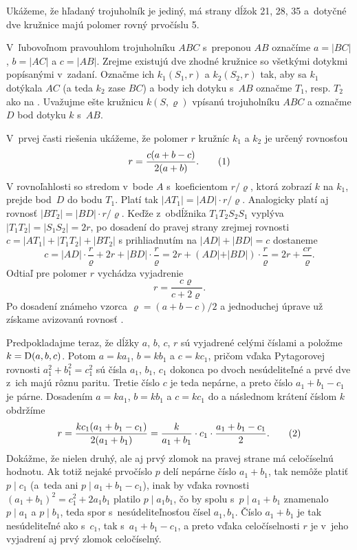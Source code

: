 {%
Ukážeme, že hľadaný trojuholník je jediný, má strany dĺžok 21, 28, 35
a~dotyčné dve kružnice majú polomer rovný prvočíslu 5.
\let\ro=\varrho

V~ľubovoľnom pravouhlom trojuholníku $ABC$ s~preponou $AB$ označíme
$a=|BC|$, $b=|AC|$ a $c=|AB|$. Zrejme existujú dve zhodné kružnice
so všetkými dotykmi popísanými v~zadaní. Označme ich $k_1(S_1,r)$ a
$k_2(S_2,r)$ tak, aby sa $k_1$ dotýkala $AC$ (a teda $k_2$ zase
$BC$) a body ich dotyku s~$AB$ označme $T_1$, resp. $T_2$
ako
na \obr{}. Uvažujme ešte kružnicu $k(S,\varrho)$ vpísanú
trojuholníku $ABC$ a označme $D$ bod dotyku $k$ s~$AB$.
%

V~prvej časti riešenia ukážeme, že polomer $r$ kružníc $k_1$ a $k_2$
je určený rovnosťou
$$
r=\frac{c(a+b-c)}{2(a+b)}.
\tag1
$$
V rovnoľahlosti so stredom v~bode $A$ s~koeficientom $r/\ro$,
ktorá zobrazí $k$ na $k_1$, prejde bod~$D$ do bodu $T_1$.
Platí tak $|AT_1|=|AD|\cdot r/\ro$. Analogicky platí
aj rovnosť $|BT_2|=|BD|\cdot r/\ro$.
Keďže z~obdĺžnika $T_1T_2S_2S_1$ vyplýva $|T_1T_2|=|S_1S_2|=2r$,
po dosadení do pravej strany zrejmej rovnosti
$c=|AT_1|+|T_1T_2|+|BT_2|$ s prihliadnutím na $|AD|+|BD|=c$
dostaneme
$$
c=|AD|\cdot\frac{r}{\ro}+2r+ |BD|\cdot\frac{r}{\ro}=
2r+(AD| + |BD|)\cdot\frac{r}{\ro}=
2r+\frac{cr}{\ro}.
$$
Odtiaľ pre polomer $r$ vychádza vyjadrenie
$$
r =\frac{c\ro}{c+2\ro}.
$$
Po dosadení známeho vzorca $\ro=(a+b-c)/2$ a jednoduchej úprave
už získame avizovanú rovnosť .

\smallskip
Predpokladajme teraz, že dĺžky $a$, $b$, $c$, $r$ sú vyjadrené
celými číslami a položme $k=\D(a,b,c)$. Potom $a=ka_1$, $b=kb_1$ a
$c=kc_1$, pričom vďaka Pytagorovej rovnosti $a_1^2+b_1^2=c_1^2$
sú čísla $a_1$, $b_1$, $c_1$ dokonca po dvoch nesúdeliteľné a
prvé dve z~ich majú rôznu paritu. Tretie číslo $c$ je teda nepárne,
a preto číslo $a_1+b_1-c_1$ je párne. Dosadením
$a=ka_1$, $b=kb_1$ a $c=kc_1$ do 
a následnom krátení číslom $k$ obdržíme
$$
r=\frac{kc_1(a_1+b_1-c_1)}{2(a_1+b_1)}=
\frac{k}{a_1+b_1}\cdot c_1 \cdot\frac{a_1+b_1-c_1}{2}.
\tag2
$$
Dokážme, že nielen druhý, ale aj prvý zlomok na pravej strane 
má celočíselnú hodnotu. Ak totiž
nejaké prvočíslo $p$ delí nepárne číslo $a_1+b_1$, tak
nemôže platiť $p \mid c_1$ (a~teda ani $p\mid a_1+b_1-c_1$),
inak by vďaka rovnosti $(a_1+b_1)^2=c_1^2+2a_1b_1$
platilo $p \mid a_1b_1$, čo by spolu s~$p\mid a_1+b_1$ znamenalo
$p \mid a_1$ a $p \mid b_1$, teda spor s~nesúdeliteľnosťou čísel
$a_1, b_1$. Číslo $a_1+b_1$ je tak nesúdeliteľné ako
s~$c_1$, tak s~$a_1+b_1-c_1$, a preto vďaka celočíselnosti $r$
je v~jeho vyjadrení  aj prvý zlomok celočíselný.

}
